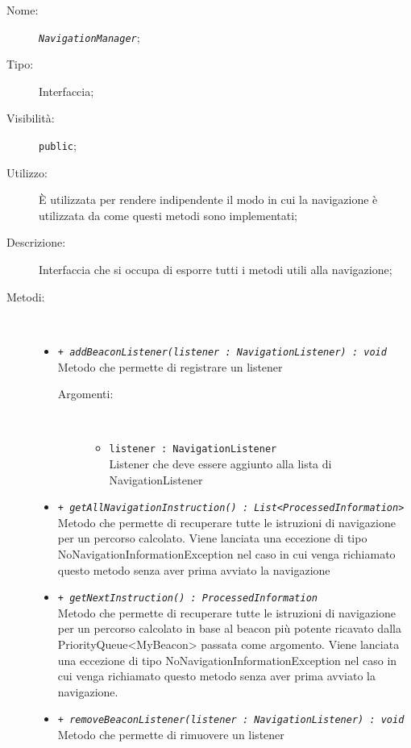 \documentclass[../DefinizioneDiProdotto.tex]{subfiles}
\begin{document}
    \begin{description}
\item[Nome:] \texttt{\textit{NavigationManager}};
\item[Tipo:] Interfaccia;
\item[Visibilità:] \texttt{public};
\item[Utilizzo:] È utilizzata per rendere indipendente il modo in cui la navigazione è utilizzata da come questi metodi sono implementati;
\item[Descrizione:] Interfaccia che si occupa di esporre tutti i metodi utili alla navigazione;
\item[Metodi:] \
\begin{itemize}
\item \texttt{+ \textit{addBeaconListener(listener : NavigationListener) : void}}\\
Metodo che permette di registrare un listener
 \begin{description}
\item[Argomenti:] \
\begin{itemize}
\item \texttt{listener : NavigationListener}\\
Listener che deve essere aggiunto alla lista di NavigationListener\end{itemize}
\end{description}
\item \texttt{+ \textit{getAllNavigationInstruction() : List<ProcessedInformation>}}\\
Metodo che permette di recuperare tutte le istruzioni di navigazione per un percorso calcolato. Viene lanciata una eccezione di tipo NoNavigationInformationException nel caso in cui venga richiamato questo metodo senza aver prima avviato la navigazione
 \item \texttt{+ \textit{getNextInstruction() : ProcessedInformation}}\\
Metodo che permette di recuperare tutte le istruzioni di navigazione per un percorso calcolato in base al beacon più potente ricavato dalla PriorityQueue<MyBeacon> passata come argomento. Viene lanciata una eccezione di tipo NoNavigationInformationException nel caso in cui venga richiamato questo metodo senza aver prima avviato la navigazione.
 \item \texttt{+ \textit{removeBeaconListener(listener : NavigationListener) : void}}\\
Metodo che permette di rimuovere un listener
 \begin{description}

\end{description}
\end{itemize}
\end{description}
\end{document}
